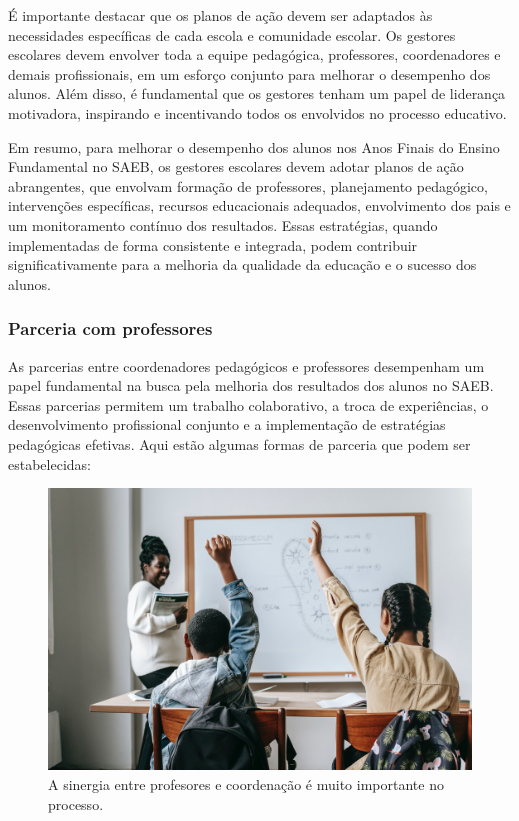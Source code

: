 É importante destacar que os planos de ação devem ser adaptados às
necessidades específicas de cada escola e comunidade escolar. Os
gestores escolares devem envolver toda a equipe pedagógica, professores,
coordenadores e demais profissionais, em um esforço conjunto para
melhorar o desempenho dos alunos. Além disso, é fundamental que os
gestores tenham um papel de liderança motivadora, inspirando e
incentivando todos os envolvidos no processo educativo.

Em resumo, para melhorar o desempenho dos alunos nos Anos Finais do
Ensino Fundamental no SAEB, os gestores escolares devem adotar planos de
ação abrangentes, que envolvam formação de professores, planejamento
pedagógico, intervenções específicas, recursos educacionais adequados,
envolvimento dos pais e um monitoramento contínuo dos resultados. Essas
estratégias, quando implementadas de forma consistente e integrada,
podem contribuir significativamente para a melhoria da qualidade da
educação e o sucesso dos alunos.

\subsubsection{Parceria com
professores}\label{parceria-com-professores}

As parcerias entre coordenadores pedagógicos e professores desempenham
um papel fundamental na busca pela melhoria dos resultados dos alunos no
SAEB. Essas parcerias permitem um trabalho colaborativo, a troca de
experiências, o desenvolvimento profissional conjunto e a implementação
de estratégias pedagógicas efetivas. Aqui estão algumas formas de
parceria que podem ser estabelecidas:

\begin{figure}
\centering
\includegraphics[width=\textwidth]{./imgs/Imagem007.jpg}
\caption{A sinergia entre profesores e coordenação é muito importante no
processo.}
\end{figure}

